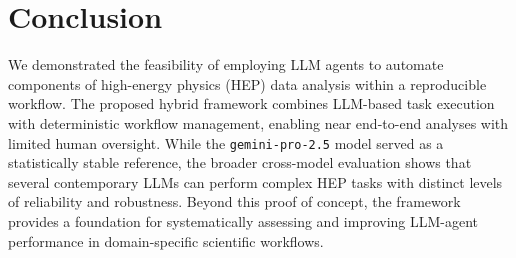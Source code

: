 \documentclass[aps,prd,reprint,superscriptaddress]{revtex4-2}
\begin{document}
\section{Conclusion}
We demonstrated the feasibility of employing LLM agents to automate components of high-energy physics (HEP) data analysis within a reproducible workflow. The proposed hybrid framework combines LLM-based task execution with deterministic workflow management, enabling near end-to-end analyses with limited human oversight. While the \texttt{gemini-pro-2.5} model served as a statistically stable reference, the broader cross-model evaluation shows that several contemporary LLMs can perform complex HEP tasks with distinct levels of reliability and robustness. Beyond this proof of concept, the framework provides a foundation for systematically assessing and improving LLM-agent performance in domain-specific scientific workflows.
\end{document}
